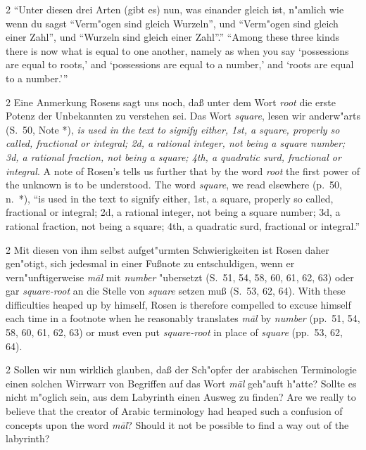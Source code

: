 \documentclass[10pt,a4paper]{article}
\renewcommand{\switchcolumn}{\syncronize\nointerlineskip\columnbreak}
\newcommand{\enquote}[1]{``#1''}
\begin{document}
\begin{paracol}{2}
\enquote{Unter diesen drei Arten (gibt es) nun, was einander gleich ist, n"amlich wie wenn du sagst \enquote{Verm"ogen sind gleich Wurzeln}, und \enquote{Verm"ogen sind gleich einer Zahl}, und \enquote{Wurzeln sind gleich einer Zahl}.}
\switchcolumn
``Among these three kinds there is now what is equal to one another, namely as when you say `possessions are equal to roots,' and `possessions are equal to a number,' and `roots are equal to a number.'''
\end{paracol}

\begin{paracol}{2}
Eine Anmerkung Rosens sagt uns noch, da\ss{} unter dem Wort \textit{root} die erste Potenz der Unbekannten zu verstehen sei. Das Wort \textit{square}, lesen wir anderw"arts (S.\ 50, Note *), \textit{is used in the text to signify either, 1st, a square, properly so called, fractional or integral; 2d, a rational integer, not being a square number; 3d, a rational fraction, not being a square; 4th, a quadratic surd, fractional or integral}.
\switchcolumn
A note of Rosen's tells us further that by the word \textit{root} the first power of the unknown is to be understood. The word \textit{square}, we read elsewhere (p.\ 50, n.\ *), ``is used in the text to signify either, 1st, a square, properly so called, fractional or integral; 2d, a rational integer, not being a square number; 3d, a rational fraction, not being a square; 4th, a quadratic surd, fractional or integral.''
\end{paracol}

\begin{paracol}{2}
Mit diesen von ihm selbst aufget"urmten Schwierigkeiten ist Rosen daher gen"otigt, sich jedesmal in einer Fu\ss{}note zu entschuldigen, wenn er vern"unftigerweise \textit{m\=al} mit \textit{number} "ubersetzt (S.\ 51, 54, 58, 60, 61, 62, 63) oder gar \textit{square-root} an die Stelle von \textit{square} setzen mu\ss{} (S.\ 53, 62, 64).
\switchcolumn
With these difficulties heaped up by himself, Rosen is therefore compelled to excuse himself each time in a footnote when he reasonably translates \textit{m\=al} by \textit{number} (pp.\ 51, 54, 58, 60, 61, 62, 63) or must even put \textit{square-root} in place of \textit{square} (pp.\ 53, 62, 64).
\end{paracol}

\begin{paracol}{2}
Sollen wir nun wirklich glauben, da\ss{} der Sch"opfer der arabischen Terminologie einen solchen Wirrwarr von Begriffen auf das Wort \textit{m\=al} geh"auft h"atte? Sollte es nicht m"oglich sein, aus dem Labyrinth einen Ausweg zu finden?
\switchcolumn
Are we really to believe that the creator of Arabic terminology had heaped such a confusion of concepts upon the word \textit{m\=al}? Should it not be possible to find a way out of the labyrinth?
\end{paracol}
\end{document}
